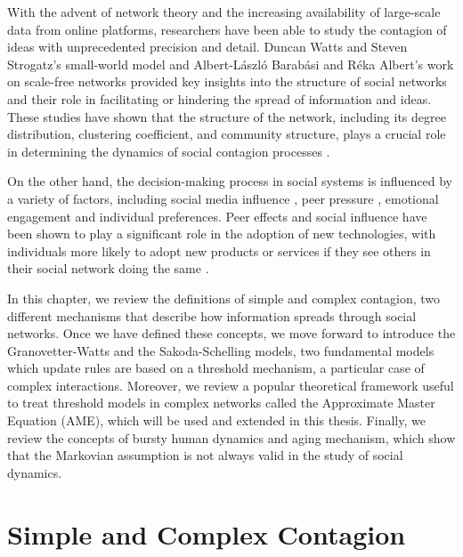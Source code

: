 With the advent of network theory and the increasing availability of large-scale data from online platforms, researchers have been able to study the contagion of ideas with unprecedented precision and detail. Duncan Watts and Steven Strogatz's small-world model \cite{watts1998collective} and Albert-László Barabási and Réka Albert's work on scale-free networks \cite{barabasi2009scale} provided key insights into the structure of social networks and their role in facilitating or hindering the spread of information and ideas. These studies have shown that the structure of the network, including its degree distribution, clustering coefficient, and community structure, plays a crucial role in determining the dynamics of social contagion processes \cite{newman2002spread, pastor-satorras-2015}.

On the other hand, the decision-making process in social systems is influenced by a variety of factors, including social media influence \cite{online-platforms, jstor}, peer pressure \cite{jensen-2015}, emotional engagement \cite{ferrara-2015, steinert-2022} and individual preferences. Peer effects and social influence have been shown to play a significant role in the adoption of new technologies, with individuals more likely to adopt new products or services if they see others in their social network doing the same \cite{rogers2014, valente-1996, bollinger-2012}.

In this chapter, we review the definitions of simple and complex contagion, two different mechanisms that describe how information spreads through social networks. Once we have defined these concepts, we move forward to introduce the Granovetter-Watts and the Sakoda-Schelling models, two fundamental models which update rules are based on a threshold mechanism, a particular case of complex interactions. Moreover, we review a popular theoretical framework useful to treat threshold models in complex networks called the Approximate Master Equation (AME), which will be used and extended in this thesis. Finally, we review the concepts of bursty human dynamics and aging mechanism, which show that the Markovian assumption is not always valid in the study of social dynamics.

\section{\label{sec:Simple and Complex Contagion} Simple and Complex Contagion}

